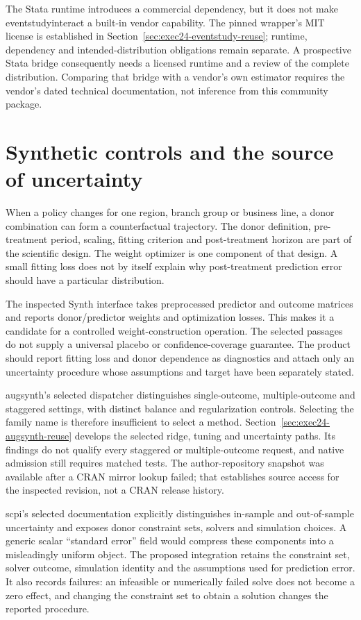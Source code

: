 The Stata runtime introduces a commercial dependency, but it does not make
eventstudyinteract a built-in vendor capability. The pinned wrapper's MIT
license is established in Section~\ref{sec:exec24-eventstudy-reuse}; runtime,
dependency and intended-distribution obligations remain separate. A prospective
Stata bridge consequently needs a licensed runtime and a review of the complete
distribution. Comparing that bridge with a vendor's own estimator
requires the vendor's dated technical documentation, not inference from this
community package.

\section{Synthetic controls and the source of uncertainty}

When a policy changes for one region, branch group or business line, a donor
combination can form a counterfactual trajectory. The donor definition,
pre-treatment period, scaling, fitting criterion and post-treatment horizon
are part of the scientific design. The weight optimizer is one component of
that design. A small fitting loss does not by itself explain why post-treatment
prediction error should have a particular distribution.

The inspected Synth interface takes preprocessed predictor and outcome
matrices and reports donor/predictor weights and optimization losses. This
makes it a candidate for a controlled weight-construction operation. The
selected passages do not supply a universal placebo or confidence-coverage
guarantee. The product should report fitting loss and donor dependence as
diagnostics and attach only an uncertainty procedure whose assumptions and
target have been separately stated. \cite{v12_sw_synth}

augsynth's selected dispatcher distinguishes single-outcome, multiple-outcome
and staggered settings, with distinct balance and regularization controls.
Selecting the family name is therefore insufficient to select a method.
Section~\ref{sec:exec24-augsynth-reuse} develops the selected ridge, tuning and
uncertainty paths. Its findings do not qualify every staggered or
multiple-outcome request, and native admission still requires matched tests.
The author-repository snapshot was available after a CRAN
mirror lookup failed; that establishes source access for the inspected
revision, not a CRAN release history. \cite{v12_sw_augsynth}

scpi's selected documentation explicitly distinguishes in-sample and
out-of-sample uncertainty and exposes donor constraint sets, solvers and
simulation choices. A generic scalar ``standard error'' field would compress
these components into a misleadingly uniform object. The proposed integration
retains the constraint set, solver outcome, simulation identity and the
assumptions used for prediction error. It also records failures: an infeasible
or numerically failed solve does not become a zero effect, and changing the
constraint set to obtain a solution changes the reported procedure.
\cite{v12_sw_scpi}

